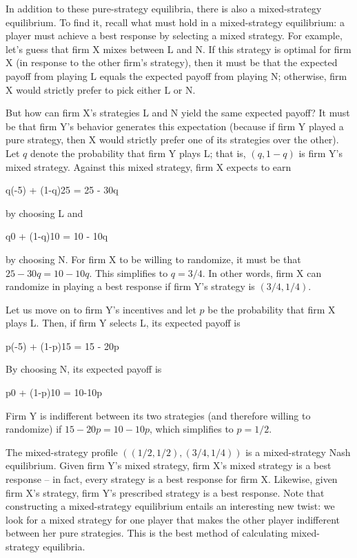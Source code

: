 In addition to these pure-strategy equilibria, there is also a mixed-strategy equilibrium. To find it, recall what must hold in a mixed-strategy equilibrium: a player must achieve a best response by selecting a mixed strategy. For example, let’s guess that firm X mixes between L and N. If this strategy is optimal for firm X (in response to the other firm’s strategy), then it must be that the expected payoff from playing L equals the expected payoff from playing N; otherwise, firm X would strictly prefer to pick either L or N.

But how can firm X’s strategies L and N yield the same expected payoff? It must be that firm Y’s behavior generates this expectation (because if firm Y played a pure strategy, then X would strictly prefer one of its strategies over the other). Let $q$ denote the probability that firm Y plays L; that is, $(q, 1 - q)$ is firm Y’s mixed strategy. Against this mixed strategy, firm X expects to earn

\bee
q(-5) + (1-q)25 = 25 - 30q
\eee

by choosing L and

\bee
q0 + (1-q)10 = 10 - 10q
\eee

by choosing N. For firm X to be willing to randomize, it must be that $25 - 30q = 10 - 10q$. This simplifies to $q = 3/4$. In other words, firm X can randomize in playing a best response if firm Y’s strategy is $(3/4, 1/4)$.

Let us move on to firm Y’s incentives and let $p$ be the probability that firm X plays L. Then, if firm Y selects L, its expected payoff is

\bee
p(-5) + (1-p)15 = 15 - 20p
\eee

By choosing N, its expected payoff is

\bee
p0 + (1-p)10 = 10-10p
\eee

Firm Y is indifferent between its two strategies (and therefore willing to randomize) if $15 - 20p = 10 - 10p$, which simplifies to $p = 1/2$.

The mixed-strategy profile $((1/2, 1/2), (3/4, 1/4))$ is a mixed-strategy Nash equilibrium. Given firm Y’s mixed strategy, firm X’s mixed strategy is a best response -- in fact, every strategy is a best response for firm X. Likewise, given firm X’s strategy, firm Y’s prescribed strategy is a best response. Note that constructing a mixed-strategy equilibrium entails an interesting new twist: we look for a mixed strategy for one player that makes the other player indifferent between her pure strategies. This is the best method of calculating mixed-strategy equilibria.

